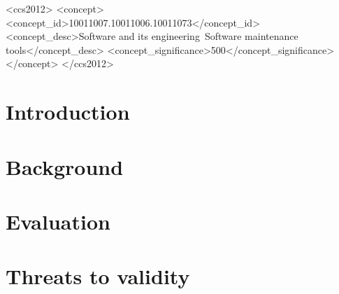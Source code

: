 \documentclass[sigconf]{acmart}
\begin{document}
\begin{CCSXML}
<ccs2012>
   <concept>
       <concept_id>10011007.10011006.10011073</concept_id>
       <concept_desc>Software and its engineering~Software maintenance tools</concept_desc>
       <concept_significance>500</concept_significance>
       </concept>
 </ccs2012>
\end{CCSXML}




\maketitle
\pagestyle{plain} %

\section{Introduction}


\section{Background}


\section{Evaluation}


\section{Threats to validity}

\end{document}
